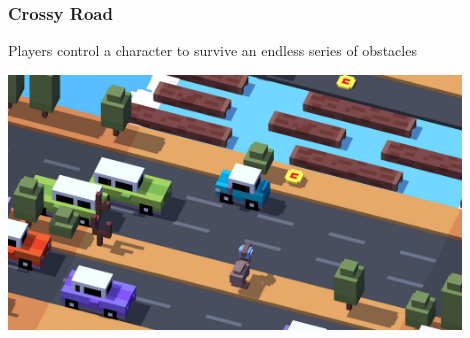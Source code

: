 \documentclass[13.5pt,aspecratio=169, xcolor=dvipsnames]{beamer}
\begin{document}
    \begin{frame}
    \onehalfspacing
        \frametitle{Crossy Road}
        \begin{mybox}
        Players control a character to survive an endless series of obstacles
        \end{mybox}
        \centering
        \includegraphics[width=0.9\textwidth]{crossy_road.jpg}
    \end{frame}
    
    
\end{document}

